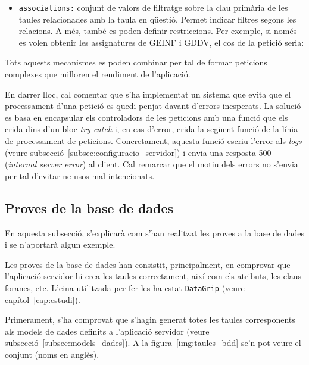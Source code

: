 \documentclass[a4paper,12pt]{ThesisStyle}
\begin{document}
\begin{itemize}
\begin{itemize}
    \begin{center}
      \texttt{}
    \end{center}
    \item \texttt{associations:} conjunt de valors de filtratge sobre la clau primària de les taules relacionades amb la taula en qüestió. Permet indicar filtres segons les relacions. A més, també es poden definir restriccions. Per exemple, si només es volen obtenir les assignatures de GEINF i GDDV, el cos de la petició seria:\\[-0.6cm]
    \begin{center}
      \texttt{}
    \end{center}
  \end{itemize}
\end{itemize}

Tots aquests mecanismes es poden combinar per tal de formar peticions complexes que milloren el rendiment de l'aplicació.

En darrer lloc, cal comentar que s'ha implementat un sistema que evita que el processament d'una petició es quedi penjat davant d'errors inesperats. La solució es basa en encapsular els controladors de les peticions amb una funció que els crida dins d'un bloc \textit{try-catch} i, en cas d'error, crida la següent funció de la línia de processament de peticions. Concretament, aquesta funció escriu l'error als \textit{logs} (veure subsecció~\ref{subsec:configuracio_servidor}) i envia una resposta 500 (\textit{internal server error}) al client. Cal remarcar que el motiu dels errors no s'envia per tal d'evitar-ne usos mal intencionats.

\subsection{Proves de la base de dades}
\label{subsec:proves_bdd}

En aquesta subsecció, s'explicarà com s'han realitzat les proves a la base de dades i se n'aportarà algun exemple.

Les proves de la base de dades han consistit, principalment, en comprovar que l'aplicació servidor hi crea les taules correctament, així com els atributs, les claus foranes, etc. L'eina utilitzada per fer-les ha estat \texttt{DataGrip} (veure capítol~\ref{cap:estudi}).

Primerament, s'ha comprovat que s'hagin generat totes les taules corresponents als models de dades definits a l'aplicació servidor (veure subsecció~\ref{subsec:models_dades}). A la figura~\ref{img:taules_bdd} se'n pot veure el conjunt (noms en anglès).
\end{document}
